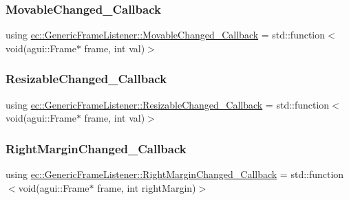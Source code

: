 \subsubsection{\texorpdfstring{Movable\+Changed\+\_\+\+Callback}{MovableChanged\_Callback}}
{\footnotesize\ttfamily using \mbox{\hyperlink{classec_1_1_generic_frame_listener_a4ed5abe7907c3c2e367e8a6f1a2b01ac}{ec\+::\+Generic\+Frame\+Listener\+::\+Movable\+Changed\+\_\+\+Callback}} =  std\+::function$<$void(agui\+::\+Frame$\ast$ frame, int val)$>$}

\mbox{\label{classec_1_1_generic_frame_listener_a726ee9bf39ca67b4fe60a1a0cc038058}} 
\subsubsection{\texorpdfstring{Resizable\+Changed\+\_\+\+Callback}{ResizableChanged\_Callback}}
{\footnotesize\ttfamily using \mbox{\hyperlink{classec_1_1_generic_frame_listener_a726ee9bf39ca67b4fe60a1a0cc038058}{ec\+::\+Generic\+Frame\+Listener\+::\+Resizable\+Changed\+\_\+\+Callback}} =  std\+::function$<$void(agui\+::\+Frame$\ast$ frame, int val)$>$}

\mbox{\label{classec_1_1_generic_frame_listener_a6df716c696c9f2d91a4ff152026c5493}} 
\subsubsection{\texorpdfstring{Right\+Margin\+Changed\+\_\+\+Callback}{RightMarginChanged\_Callback}}
{\footnotesize\ttfamily using \mbox{\hyperlink{classec_1_1_generic_frame_listener_a6df716c696c9f2d91a4ff152026c5493}{ec\+::\+Generic\+Frame\+Listener\+::\+Right\+Margin\+Changed\+\_\+\+Callback}} =  std\+::function$<$void(agui\+::\+Frame$\ast$ frame, int right\+Margin)$>$}

